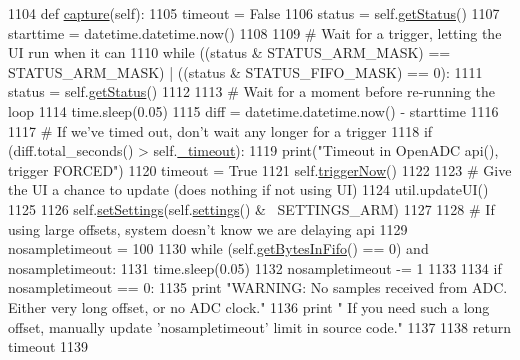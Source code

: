 \begin{DoxyCode}
1104     \textcolor{keyword}{def }\hyperlink{classsoftware_1_1chipwhisperer_1_1capture_1_1scopes_1_1__OpenADCInterface_1_1OpenADCInterface_abfe26d2fd7a5e4f388ef343ef737ad7f}{capture}(self):
1105         timeout = \textcolor{keyword}{False}
1106         status = self.\hyperlink{classsoftware_1_1chipwhisperer_1_1capture_1_1scopes_1_1__OpenADCInterface_1_1OpenADCInterface_a3e4d695b0089efcfffacfc27cc18ef62}{getStatus}()
1107         starttime = datetime.datetime.now()
1108 
1109         \textcolor{comment}{# Wait for a trigger, letting the UI run when it can}
1110         \textcolor{keywordflow}{while} ((status & STATUS\_ARM\_MASK) == STATUS\_ARM\_MASK) | ((status & STATUS\_FIFO\_MASK) == 0):
1111             status = self.\hyperlink{classsoftware_1_1chipwhisperer_1_1capture_1_1scopes_1_1__OpenADCInterface_1_1OpenADCInterface_a3e4d695b0089efcfffacfc27cc18ef62}{getStatus}()
1112             
1113             \textcolor{comment}{# Wait for a moment before re-running the loop}
1114             time.sleep(0.05)
1115             diff = datetime.datetime.now() - starttime
1116 
1117             \textcolor{comment}{# If we've timed out, don't wait any longer for a trigger}
1118             \textcolor{keywordflow}{if} (diff.total\_seconds() > self.\hyperlink{classsoftware_1_1chipwhisperer_1_1capture_1_1scopes_1_1__OpenADCInterface_1_1OpenADCInterface_a10c97e61fb77c49fba557f3e0ed55c58}{\_timeout}):
1119                 print(\textcolor{stringliteral}{"Timeout in OpenADC api(), trigger FORCED"})
1120                 timeout = \textcolor{keyword}{True}
1121                 self.\hyperlink{classsoftware_1_1chipwhisperer_1_1capture_1_1scopes_1_1__OpenADCInterface_1_1OpenADCInterface_ab8ea200041e774ed9b2350142bafcd01}{triggerNow}()
1122 
1123             \textcolor{comment}{# Give the UI a chance to update (does nothing if not using UI)}
1124             util.updateUI()
1125 
1126         self.\hyperlink{classsoftware_1_1chipwhisperer_1_1capture_1_1scopes_1_1__OpenADCInterface_1_1OpenADCInterface_a797afcc60bb2e95a8e82f56ab6d01f01}{setSettings}(self.\hyperlink{classsoftware_1_1chipwhisperer_1_1capture_1_1scopes_1_1__OpenADCInterface_1_1OpenADCInterface_a3e1455f1e5fe5b7c9235ffb94d17c269}{settings}() & ~SETTINGS\_ARM)
1127         
1128         \textcolor{comment}{# If using large offsets, system doesn't know we are delaying api}
1129         nosampletimeout = 100
1130         \textcolor{keywordflow}{while} (self.\hyperlink{classsoftware_1_1chipwhisperer_1_1capture_1_1scopes_1_1__OpenADCInterface_1_1OpenADCInterface_a4a7ab6ae9d9472c7839fe6420e0f71f8}{getBytesInFifo}() == 0) \textcolor{keywordflow}{and} nosampletimeout:
1131             time.sleep(0.05)
1132             nosampletimeout -= 1
1133 
1134         \textcolor{keywordflow}{if} nosampletimeout == 0:
1135             \textcolor{keywordflow}{print} \textcolor{stringliteral}{"WARNING: No samples received from ADC. Either very long offset, or no ADC clock."}
1136             \textcolor{keywordflow}{print} \textcolor{stringliteral}{"         If you need such a long offset, manually update 'nosampletimeout' limit in
       source code."}
1137         
1138         \textcolor{keywordflow}{return} timeout
1139 
\end{DoxyCode}
